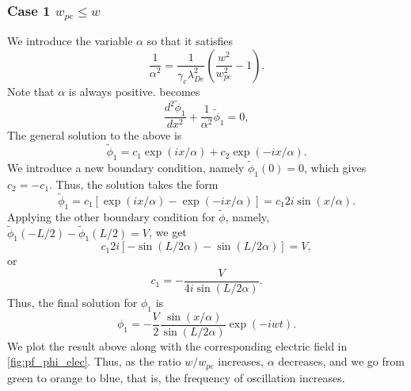 \documentclass[a4paper,11pt]{report}
\begin{document}
\subsubsection{Case 1 $w_{pe} \le w$}
We introduce the variable $\alpha$ so that it satisfies
\begin{equation}
    \frac{1}{\alpha^2} = \frac{1}{\gamma_e \lambda^2_{De}} \left( \frac{w^2}{w^2_{pe}} - 1 \right).
\end{equation}
Note that $\alpha$ is always positive.  becomes 
\begin{equation}
    \frac{d^2 \tilde{\phi}_1}{dx^2} + \frac{1}{\alpha^2} \tilde{\phi}_1 = 0,
\end{equation}
The general solution to the above is
\begin{equation*}
    \tilde{\phi}_1 = c_1 \exp (i x / \alpha) + c_2 \exp (-i x / \alpha).
\end{equation*}
We introduce a new boundary condition, namely $\tilde{\phi}_1(0) = 0$, which gives $c_2 = -c_1$. Thus, the solution takes the form
\begin{equation*}
    \tilde{\phi}_1 = c_1 \left[ \exp (i x / \alpha) - \exp (-i x / \alpha) \right] = c_1 2i \sin ( x / \alpha ).
\end{equation*}
Applying the other boundary condition for $\tilde{\phi}$, namely, $\tilde{\phi}_1(-L/2) - \tilde{\phi}_1(L/2) = V$, we get
\begin{equation*}
    c_1 2i \left[ -\sin \left( L / 2\alpha \right) - \sin \left( L / 2\alpha \right) \right] = V,
\end{equation*}
or
\begin{equation*}
    c_1 = - \frac{V}{4i \sin \left( L / 2\alpha \right)}.
\end{equation*}
Thus, the final solution for $\phi_1$ is
\begin{equation}
    \phi_1 = - \frac{V}{2} \frac{\sin (x / \alpha)}{\sin (L / 2\alpha)} \exp(-iwt).
\end{equation}
We plot the result above along with the corresponding electric field in \cref{fig:pf_phi_elec}. Thus, as the ratio $w/w_{pe}$ increases, $\alpha$ decreases, and we go from green to orange to blue, that is, the frequency of oscillation increases.
\end{document}
